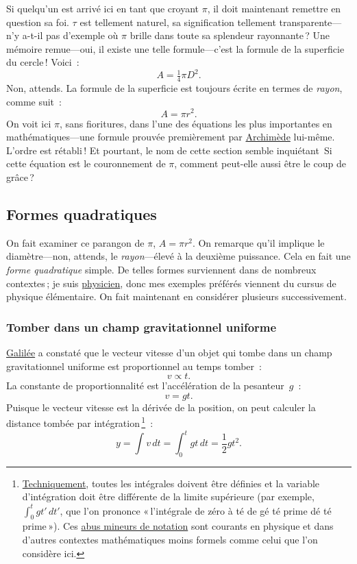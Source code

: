 Si quelqu'un est arrivé ici en tant que croyant $\pi$, il doit maintenant remettre en question sa foi. $\tau$ est tellement naturel, sa signification tellement transparente---n'y a-t-il pas d'exemple où $\pi$ brille dans toute sa splendeur rayonnante\,? Une mémoire remue---oui, il existe une telle formule---c'est la formule de la superficie du cercle\,! Voici~:
\[ A = \tfrac{1}{4} \pi D^2. \]
Non, attends. La formule de la superficie est toujours écrite en termes de \emph{rayon}, comme suit~:
\[ A = \pi r^2. \]
On voit ici $\pi$, sans fioritures, dans l'une des équations les plus importantes en mathématiques---une formule prouvée premièrement par \href{https://fr.wikipedia.org/wiki/Archimède}{Archimède} lui-même. L'ordre est rétabli\,! Et pourtant, le nom de cette section semble inquiétant\textellipsis\ Si cette équation est le couronnement de $\pi$, comment peut-elle aussi être le coup de grâce\,?


  \subsection{Formes quadratiques} %
  \label{sec:quadratic_forms}

On fait examiner ce parangon de $\pi$, $A = \pi r^2$. On remarque qu'il implique le diamètre---non, attends, le \emph{rayon}---élevé à la deuxième puissance. Cela en fait une \emph{forme quadratique} simple. De telles formes surviennent dans de nombreux contextes\,; je suis \href{https://thesis.library.caltech.edu/1940/}{physicien}, donc mes exemples préférés viennent du cursus de physique élémentaire. On fait maintenant en considérer plusieurs successivement.

    \subsubsection{Tomber dans un champ gravitationnel uniforme} %
    \label{sec:falling_in_a_uniform_gravitational_field}

\href{https://fr.wikipedia.org/wiki/Galil%C3%A9e_(savant)}{Galilée} a constaté que le vecteur vitesse d'un objet qui tombe dans un champ gravitationnel uniforme est proportionnel au temps tomber~:
\[ v \propto t. \]
La constante de proportionnalité est l'accélération de la pesanteur~$g$~:
\[ v = g t. \]
Puisque le vecteur vitesse est la dérivée de la position, on peut calculer la distance tombée par intégration\,\footnote{\href{https://bit.ly/32mB2CF}{Techniquement}, toutes les intégrales doivent être définies et la variable d'intégration doit être différente de la limite supérieure (par exemple, $\int_{0}^{t} gt'\, dt'$, que l'on prononce «\,l'intégrale de zéro à té de gé té prime dé té prime\,»). Ces \href{https://fr.wikipedia.org/wiki/Abus_de_notation}{abus mineurs de notation} sont courants en physique et dans d'autres contextes mathématiques moins formels comme celui que l'on considère ici.}~:
\[ y = \int v\,dt = \int_0^t gt\,dt = \textstyle{\frac{1}{2}} gt^2. \]


